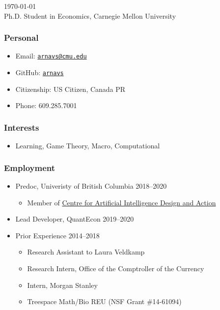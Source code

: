 \documentclass[12pt]{article}   %
\begin{document}
\renewcommand{\labelitemi}{~}

 \hfill \monthyeardate\today \\
\flushleft Ph.D. Student in Economics, Carnegie Mellon University

\subsubsection*{Personal}
\begin{itemize}
  \item Email: \href{mailto:arnavs@cmu.edu}{\texttt{arnavs@cmu.edu}}
  \item GitHub: \href{https://github.com/arnavs}{\texttt{arnavs}}
  \item Citizenship: US Citizen, Canada PR
  \item Phone: 609.285.7001
\end{itemize}

\subsubsection*{Interests}
\begin{itemize}
  \item Learning, Game Theory, Macro, Computational 
\end{itemize} 

\subsubsection*{Employment}
\begin{itemize}
  \item Predoc, Univeristy of British Columbia \hfill 2018--2020
  \begin{itemize} \small
    \item Member of \href{https://caida.ubc.ca/caida-ubc-icics-centre-artificial-intelligence-decision-making-and-action}{Centre for Artificial Intelligence Design and Action}
  \end{itemize}
  \item Lead Developer, QuantEcon \hfill 2019--2020
  \item Prior Experience \hfill 2014--2018 
  \begin{itemize}\setlength{\leftskip}{1cm}
    \item Research Assistant to Laura Veldkamp
    \item Research Intern, Office of the Comptroller of the Currency
    \item Intern, Morgan Stanley 
    \item Treespace Math/Bio REU (NSF Grant \#14-61094)
  \end{itemize}
\end{itemize}
\end{document}

